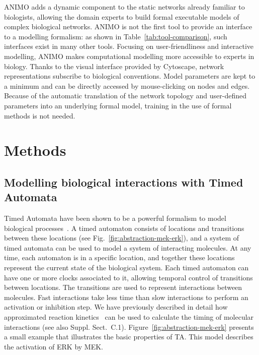\documentclass{bmcart}
\def\ta{Timed Automaton}
\def\tas{Timed Automata}
\begin{document}
ANIMO adds a dynamic component to the static networks already familiar to biologists,
allowing the domain experts to build formal executable models of complex biological networks.
ANIMO is not the first tool to provide an interface to a
modelling formalism: as shown in Table~\ref{tab:tool-comparison}, such interfaces exist in many other tools.
Focusing on user-friendliness and interactive modelling, ANIMO
makes computational modelling more accessible to experts in biology.
Thanks to the visual
interface provided by Cytoscape, network representations subscribe to biological conventions.
Model parameters are kept to a minimum and can be directly accessed by mouse-clicking on
nodes and edges. Because of the automatic translation of the network topology and
user-defined parameters into an underlying formal model, training in the use of formal methods
is not needed.







\section*{Methods}

\subsection*{Modelling biological interactions with Timed Automata}\label{subsec:timed-automata}
\def\ta{TA}
\def\tas{TA}

Timed Automata have been shown to be a powerful formalism to model biological
processes~\cite{ta-siebert,bartocci-oscillators,oded-ode-ta-discretization}. A timed automaton consists of locations
and transitions between these locations (see Fig.~\ref{fig:abstraction-mek-erk}), and a system of timed automata can be
used to model a system of interacting molecules. At any time, each automaton is in a specific location, and together
these locations represent the current state of the biological system. Each timed automaton can have one or more clocks
associated to it, allowing temporal control of transitions between locations. The transitions are used to
represent interactions between molecules. Fast interactions take less time than slow interactions
to perform an activation or inhibition step. We have previously described in detail how approximated
reaction kinetics~\cite{animo-ieee} can be used to calculate the timing of molecular
interactions (see also Suppl. Sect.~C.1). %
Figure~\ref{fig:abstraction-mek-erk}
presents a small example that illustrates the basic properties of \tas.
This model describes the activation of ERK by MEK.
\end{document}
